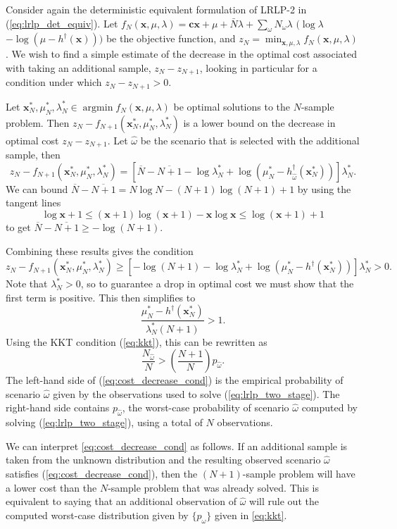 \documentclass[11pt]{article}
\newcommand{\x}{\mathbf{x}}
\renewcommand{\c}{\mathbf{c}}
\DeclareMathOperator*{\argmin}{argmin}
\begin{document}
Consider again the deterministic equivalent formulation of LRLP-2 in (\ref{eq:lrlp_det_equiv}).
Let $f_N(\x,\mu,\lambda) =  \c\x + \mu + \bar{N}\lambda + \sum_\omega N_\omega\lambda$ $(\log\lambda$ $- \log(\mu-h^\dagger(\x)))$ be the objective function, and $z_N = \min_{\x,\mu,\lambda} f_N(\x,\mu,\lambda)$.
We wish to find a simple estimate of the decrease in the optimal cost associated with taking an additional sample, $z_N - z_{N+1}$, looking in particular for a condition under which $z_N - z_{N+1} > 0$.

Let $\x^*_N, \mu^*_N,\lambda^*_N \in \argmin f_N(\x,\mu,\lambda)$ be optimal solutions to the $N$-sample problem.
Then $z_N - f_{N+1}(\x^*_N,\mu^*_N,\lambda^*_N)$ is a lower bound on the decrease in optimal cost $z_N - z_{N+1}$.
Let $\hat{\omega}$ be the scenario that is selected with the additional sample, then 
\[
	z_N - f_{N+1}(\x^*_N,\mu^*_N,\lambda^*_N) = \left[ \overline{N} - \overline{N+1} - \log \lambda^*_N + \log(\mu^*_N - h^\dagger_{\hat{\omega}}(\x^*_N)) \right] \lambda^*_N.
\]
We can bound $\overline{N} - \overline{N+1} = N\log N - (N+1)\log(N+1) + 1$ by using the tangent lines
\[
	\log \x + 1 \leq (\x+1)\log(\x+1) - \x\log \x \leq \log(\x+1) + 1
\]
to get $\overline{N} - \overline{N+1} \geq -\log(N+1)$.

Combining these results gives the condition
\[
	z_N - f_{N+1}(\x^*_N,\mu^*_N,\lambda^*_N) \geq \left[ -\log(N+1) - \log\lambda^*_N + \log(\mu^*_N-h^\dagger(\x^*_N))\right]\lambda^*_N > 0.
\]
Note that $\lambda^*_N > 0$, so to guarantee a drop in optimal cost we must show that the first term is positive.
This then simplifies to
\[
	\frac{\mu^*_N - h^\dagger(\x^*_N)}{\lambda^*_N(N+1)} > 1.
\]
Using the KKT condition (\ref{eq:kkt}), this can be rewritten as
\begin{equation} \label{eq:cost_decrease_cond}
	\frac{N_{\hat{\omega}}}{N} > \left( \frac{N+1}{N} \right) p_{\hat{\omega}}.
\end{equation}
The left-hand side of (\ref{eq:cost_decrease_cond}) is the empirical probability of scenario $\hat{\omega}$ given by the observations used to solve (\ref{eq:lrlp_two_stage}).
The right-hand side contains $p_{\hat{\omega}}$, the worst-case probability of scenario $\hat{\omega}$ computed by solving (\ref{eq:lrlp_two_stage}), using a total of $N$ observations.

We can interpret \eqref{eq:cost_decrease_cond} as follows. If an additional sample is taken from the unknown distribution and the resulting observed scenario $\hat{\omega}$ satisfies (\ref{eq:cost_decrease_cond}), then the $(N+1)$-sample problem will have a lower cost than the $N$-sample problem that was already solved.
This is equivalent to saying that an additional observation of $\hat{\omega}$ will rule out the computed worst-case distribution given by $\{p_\omega\}$ given in \eqref{eq:kkt}.
\end{document}
